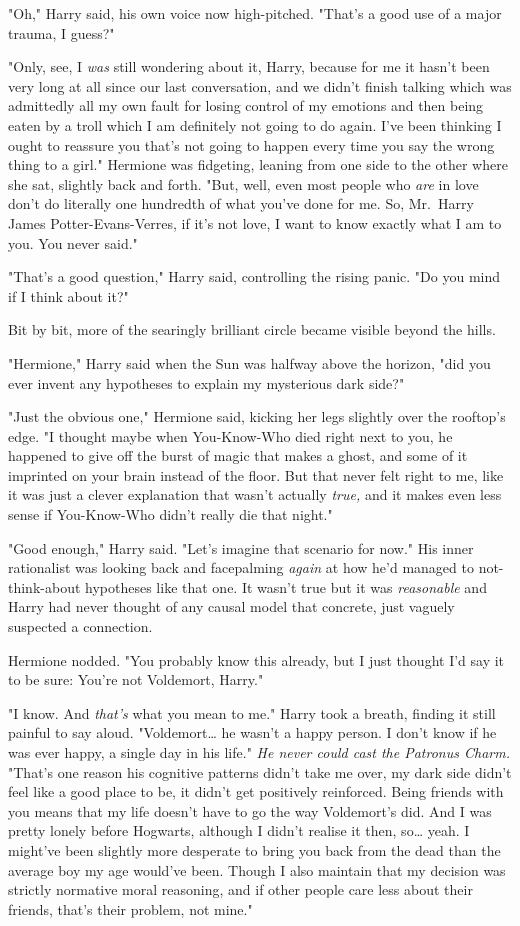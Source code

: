 "Oh," Harry said, his own voice now high-pitched. "That's a good use of a major
trauma, I guess?"

"Only, see, I \emph{was} still wondering about it, Harry, because for me it
hasn't been very long at all since our last conversation, and we didn't finish
talking which was admittedly all my own fault for losing control of my emotions
and then being eaten by a troll which I am definitely not going to do again.
I've been thinking I ought to reassure you that's not going to happen every
time you say the wrong thing to a girl." Hermione was fidgeting, leaning from
one side to the other where she sat, slightly back and forth. "But, well, even
most people who \emph{are} in love don't do literally one hundredth of what
you've done for me. So, Mr.~Harry James Potter-Evans-Verres, if it's not love,
I want to know exactly what I am to you. You never said."

"That's a good question," Harry said, controlling the rising panic. "Do you
mind if I think about it?"

Bit by bit, more of the searingly brilliant circle became visible beyond the
hills.

"Hermione," Harry said when the Sun was halfway above the horizon, "did you
ever invent any hypotheses to explain my mysterious dark side?"

"Just the obvious one," Hermione said, kicking her legs slightly over the
rooftop's edge. "I thought maybe when You-Know-Who died right next to you, he
happened to give off the burst of magic that makes a ghost, and some of it
imprinted on your brain instead of the floor. But that never felt right to me,
like it was just a clever explanation that wasn't actually \emph{true,} and it
makes even less sense if You-Know-Who didn't really die that night."

"Good enough," Harry said. "Let's imagine that scenario for now." His inner
rationalist was looking back and facepalming \emph{again} at how he'd managed
to not-think-about hypotheses like that one. It wasn't true but it was
\emph{reasonable} and Harry had never thought of any causal model that
concrete, just vaguely suspected a connection.

Hermione nodded. "You probably know this already, but I just thought I'd say it
to be sure: You're not Voldemort, Harry."

"I know. And \emph{that's} what you mean to me." Harry took a breath, finding
it still painful to say aloud. "Voldemort{\ldots} he wasn't a happy person. I
don't know if he was ever happy, a single day in his life." \emph{He never
could cast the Patronus Charm.} "That's one reason his cognitive patterns
didn't take me over, my dark side didn't feel like a good place to be, it
didn't get positively reinforced. Being friends with you means that my life
doesn't have to go the way Voldemort's did. And I was pretty lonely before
Hogwarts, although I didn't realise it then, so{\ldots} yeah. I might've been
slightly more desperate to bring you back from the dead than the average boy my
age would've been. Though I also maintain that my decision was strictly
normative moral reasoning, and if other people care less about their friends,
that's their problem, not mine."

